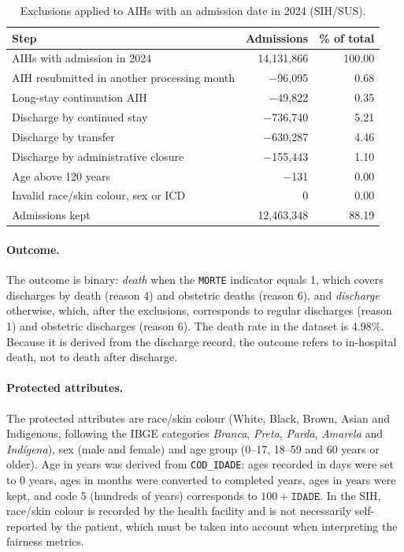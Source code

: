 \begin{table}[htbp]
  \centering
  \caption{Exclusions applied to AIHs with an admission date in 2024 (SIH/SUS).}
  \label{tab:sih-funnel}
  \begin{tabular}{lrr}
    \toprule
    Step & Admissions & \% of total \\
    \midrule
    AIHs with admission in 2024 & 14,131,866 & 100.00 \\
    AIH resubmitted in another processing month & $-$96,095 & 0.68 \\
    Long-stay continuation AIH & $-$49,822 & 0.35 \\
    Discharge by continued stay & $-$736,740 & 5.21 \\
    Discharge by transfer & $-$630,287 & 4.46 \\
    Discharge by administrative closure & $-$155,443 & 1.10 \\
    Age above 120 years & $-$131 & 0.00 \\
    Invalid race/skin colour, sex or ICD & 0 & 0.00 \\
    \midrule
    Admissions kept & 12,463,348 & 88.19 \\
    \bottomrule
  \end{tabular}
\end{table}

\paragraph{Outcome.}
The outcome is binary: \emph{death} when the \texttt{MORTE} indicator equals 1,
which covers discharges by death (reason 4) and obstetric deaths (reason 6),
and \emph{discharge} otherwise, which, after the exclusions, corresponds to
regular discharges (reason 1) and obstetric discharges (reason 6). The death
rate in the dataset is 4.98\%. Because it is derived from the discharge record,
the outcome refers to in-hospital death, not to death after discharge.

\paragraph{Protected attributes.}
The protected attributes are race/skin colour (White, Black, Brown, Asian and
Indigenous, following the IBGE categories \emph{Branca}, \emph{Preta},
\emph{Parda}, \emph{Amarela} and \emph{Indígena}), sex (male and female) and age
group (0--17, 18--59 and 60 years or older). Age in years was derived from
\texttt{COD\_IDADE}: ages recorded in days were set to 0 years, ages in months
were converted to completed years, ages in years were kept, and code 5
(hundreds of years) corresponds to $100 + \texttt{IDADE}$. In the SIH, race/skin
colour is recorded by the health facility and is not necessarily
self-reported by the patient, which must be taken into account when
interpreting the fairness metrics.

